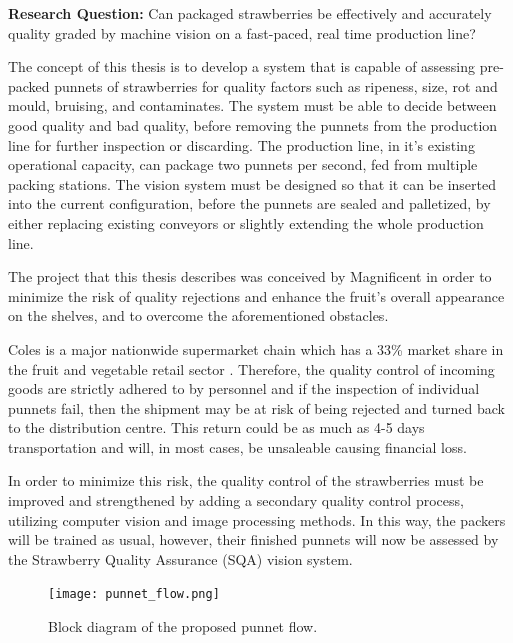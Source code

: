 \documentclass[fleqn,twoside]{article}
\begin{document}
\textbf{Research Question:} Can packaged strawberries be effectively and accurately quality graded by machine vision on a fast-paced, real time production line?

The concept of this thesis is to develop a system that is capable of assessing pre-packed punnets of strawberries for quality factors such as ripeness, size, rot and mould, bruising, and contaminates. The system must be able to decide between good quality and bad quality, before removing the punnets from the production line for further inspection or discarding. The production line, in it's existing operational capacity, can package two punnets per second, fed from multiple packing stations. The vision system must be designed so that it can be inserted into the current configuration, before the punnets are sealed and palletized, by either replacing existing conveyors or slightly extending the whole production line. 

The project that this thesis describes was conceived by Magnificent in order to minimize the risk of quality rejections and enhance the fruit's overall appearance on the shelves, and to overcome the aforementioned obstacles.

Coles is a major nationwide supermarket chain which has a 33\% market share in the fruit and vegetable retail sector \cite{roymorgan}. Therefore, the quality control of incoming goods are strictly adhered to by personnel and if the inspection of individual punnets fail, then the shipment may be at risk of being rejected and turned back to the distribution centre. This return could be as much as 4-5 days transportation and will, in most cases, be unsaleable causing financial loss.

In order to minimize this risk, the quality control of the strawberries must be improved and strengthened by adding a secondary quality control process, utilizing computer vision and image processing methods. In this way, the packers will be trained as usual, however, their finished punnets will now be assessed by the Strawberry Quality Assurance (SQA) vision system.

\begin{figure}[h]
	\centering
	\texttt{[image: punnet\_flow.png]}
	\caption{Block diagram of the proposed punnet flow.}
	\label{fig:punnet_flow}
\end{figure}
\end{document}
